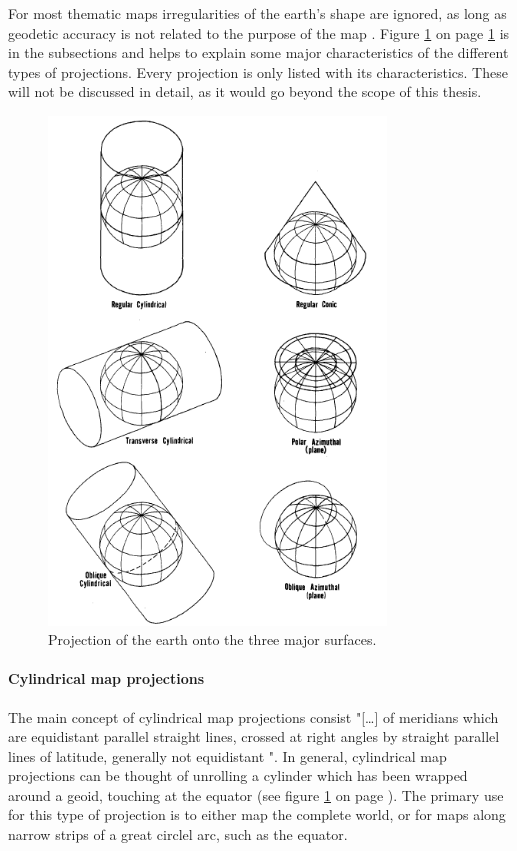 For most thematic maps irregularities of the earth's shape are ignored, as long as geodetic accuracy is not related to the purpose of the map . Figure \ref{fig:projections-base} on page \ref{fig:projections-base} is in the subsections and helps to explain some major characteristics of the different types of projections. Every projection is only listed with its characteristics. These will not be discussed in detail, as it would go beyond the scope of this thesis.

\begin{figure}[!htb]
\centering
\includegraphics[width=0.8\textwidth,keepaspectratio]{images/methods/mappings.png}
\caption[
    Projection of the earth onto the three major surfaces .
]{Projection of the earth onto the three major surfaces.}
\label{fig:projections-base}
\end{figure}

\paragraph{Cylindrical map projections}
The main concept of cylindrical map projections consist "[\ldots] of meridians which are equidistant parallel straight lines, crossed at right angles by straight parallel lines of latitude, generally not equidistant ".
In general, cylindrical map projections can be thought of unrolling a cylinder which has been wrapped around a geoid, touching at the equator (see figure \ref{fig:projections-base} on page \pageref{fig:projections-base}).
The primary use for this type of projection is to either map the complete world, or for maps along narrow strips of a great circlel arc, such as the equator.

